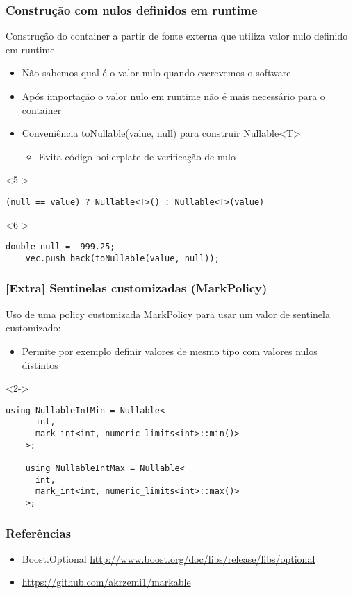 \documentclass[t]{beamer}
\begin{document}
\begin{frame}[fragile]
  \frametitle{Construção com nulos definidos em runtime}
  Construção do container a partir de fonte externa que utiliza valor nulo definido em runtime
  \begin{itemize}
    \item<1->{Não sabemos qual é o valor nulo quando escrevemos o software}
    \item<2->{Após importação o valor nulo em runtime não é mais necessário para o container}
    \item<3->{Conveniência toNullable(value, null) para construir Nullable<T>}
      \begin{itemize}
      \item<4->{Evita código boilerplate de verificação de nulo}
      \end{itemize}
  \end{itemize}


  \begin{onlyenv}<5->
  \begin{lstlisting}[escapeinside=`']
    (null == value) ? Nullable<T>() : Nullable<T>(value)
  \end{lstlisting}
  \end{onlyenv}

  \begin{onlyenv}<6->
  \begin{lstlisting}[escapeinside=`']
    double null = -999.25;
    vec.push_back(toNullable(value, null));
  \end{lstlisting}
  \end{onlyenv}
\end{frame}

\begin{frame}[fragile]
  \frametitle{[Extra] Sentinelas customizadas (MarkPolicy)}
  Uso de uma policy customizada MarkPolicy para usar um valor de sentinela customizado:
  \begin{itemize}
    \item<1->{Permite por exemplo definir valores de mesmo tipo com valores nulos distintos}
  \end{itemize}

  \begin{onlyenv}<2->
  \begin{lstlisting}[basicstyle=\small]
    using NullableIntMin = Nullable<
      int, 
      mark_int<int, numeric_limits<int>::min()>
    >;

    using NullableIntMax = Nullable<
      int, 
      mark_int<int, numeric_limits<int>::max()>
    >;
  \end{lstlisting}
  \end{onlyenv}
\end{frame}

\begin{frame}[fragile]
  \frametitle{Referências}
  \begin{itemize}
    \item{Boost.Optional \url{http://www.boost.org/doc/libs/release/libs/optional}}
    \item{\url{https://github.com/akrzemi1/markable}}
  \end{itemize}
\end{frame}
\end{document}

